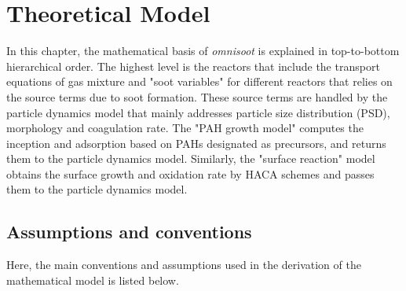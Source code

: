 \chapter{Theoretical Model}
In this chapter, the mathematical basis of \textit{omnisoot} is explained in top-to-bottom hierarchical order. The highest level is the reactors that include the transport equations of gas mixture and "soot variables" for different reactors that relies on the source terms due to soot formation. These source terms are handled by the particle dynamics model that mainly addresses particle size distribution (PSD), morphology and coagulation rate. The "PAH growth model" computes the inception and adsorption based on PAHs designated as precursors, and returns them to the particle dynamics model. Similarly, the "surface reaction" model obtains the surface growth and oxidation rate by HACA schemes and passes them to the particle dynamics model. 

\section{Assumptions and conventions}
Here, the main conventions and assumptions used in the derivation of the mathematical model is listed below.

